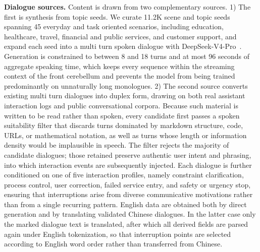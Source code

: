 \textbf{Dialogue sources.} Content is drawn from two complementary sources. 1) The first is synthesis from topic seeds. We curate 11.2K scene and topic seeds spanning 45 everyday and task oriented scenarios, including education, healthcare, travel, financial and public services, and customer support, and expand each seed into a multi turn spoken dialogue with DeepSeek-V4-Pro~\cite{xu2026deepseek}. Generation is constrained to between 8 and 18 turns and at most 96 seconds of aggregate speaking time, which keeps every sequence within the streaming context of the front cerebellum and prevents the model from being trained predominantly on unnaturally long monologues. 2) The second source converts existing multi turn dialogues into duplex form, drawing on both real assistant interaction logs and public conversational corpora. Because such material is written to be read rather than spoken, every candidate first passes a spoken suitability filter that discards turns dominated by markdown structure, code, URLs, or mathematical notation, as well as turns whose length or information density would be implausible in speech. The filter rejects the majority of candidate dialogues; those retained preserve authentic user intent and phrasing, into which interaction events are subsequently injected. Each dialogue is further conditioned on one of five interaction profiles, namely constraint clarification, process control, user correction, failed service entry, and safety or urgency stop, ensuring that interruptions arise from diverse communicative motivations rather than from a single recurring pattern. English data are obtained both by direct generation and by translating validated Chinese dialogues. In the latter case only the marked dialogue text is translated, after which all derived fields are parsed again under English tokenization, so that interruption points are selected according to English word order rather than transferred from Chinese.

